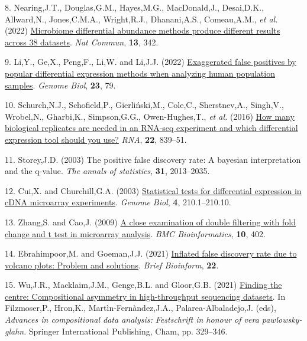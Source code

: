 \documentclass[
]{article}
\newlength{\cslhangindent}
\newenvironment{CSLReferences}[2] %
 {\begin{list}{}{%
  \setlength{\itemindent}{0pt}
  \setlength{\leftmargin}{0pt}
  \setlength{\parsep}{0pt}
  \ifodd #1
   \setlength{\leftmargin}{\cslhangindent}
   \setlength{\itemindent}{-1\cslhangindent}
  \fi
  \setlength{\itemsep}{#2\baselineskip}}}
 {\end{list}}
\begin{document}
\begin{CSLReferences}{1}{1}
8. Nearing,J.T., Douglas,G.M., Hayes,M.G., MacDonald,J., Desai,D.K.,
Allward,N., Jones,C.M.A., Wright,R.J., Dhanani,A.S., Comeau,A.M.,
\emph{et al.} (2022)
\href{https://doi.org/10.1038/s41467-022-28034-z}{Microbiome
differential abundance methods produce different results across 38
datasets}. \emph{Nat Commun}, \textbf{13}, 342.

9. Li,Y., Ge,X., Peng,F., Li,W. and Li,J.J. (2022)
\href{https://doi.org/10.1186/s13059-022-02648-4}{Exaggerated false
positives by popular differential expression methods when analyzing
human population samples}. \emph{Genome Biol}, \textbf{23}, 79.

10. Schurch,N.J., Schofield,P., Gierliński,M., Cole,C., Sherstnev,A.,
Singh,V., Wrobel,N., Gharbi,K., Simpson,G.G., Owen-Hughes,T., \emph{et
al.} (2016) \href{https://doi.org/10.1261/rna.053959.115}{How many
biological replicates are needed in an RNA-seq experiment and which
differential expression tool should you use?} \emph{RNA}, \textbf{22},
839--51.

11. Storey,J.D. (2003) The positive false discovery rate: A bayesian
interpretation and the q-value. \emph{The annals of statistics},
\textbf{31}, 2013--2035.

12. Cui,X. and Churchill,G.A. (2003)
\href{https://www.ncbi.nlm.nih.gov/pubmed/12702200}{Statistical tests
for differential expression in cDNA microarray experiments}.
\emph{Genome Biol}, \textbf{4}, 210.1--210.10.

13. Zhang,S. and Cao,J. (2009)
\href{https://doi.org/10.1186/1471-2105-10-402}{A close examination of
double filtering with fold change and t test in microarray analysis}.
\emph{BMC Bioinformatics}, \textbf{10}, 402.

14. Ebrahimpoor,M. and Goeman,J.J. (2021)
\href{https://doi.org/10.1093/bib/bbab053}{Inflated false discovery rate
due to volcano plots: Problem and solutions}. \emph{Brief Bioinform},
\textbf{22}.

15. Wu,J.R., Macklaim,J.M., Genge,B.L. and Gloor,G.B. (2021)
\href{https://doi.org/10.1007/978-3-030-71175-7_17}{Finding the centre:
Compositional asymmetry in high-throughput sequencing datasets}. In
Filzmoser,P., Hron,K., Martìn-Fernàndez,J.A., Palarea-Albaladejo,J.
(eds), \emph{Advances in compositional data analysis: Festschrift in
honour of vera pawlowsky-glahn}. Springer International Publishing,
Cham, pp. 329--346.


\end{CSLReferences}
\end{document}
